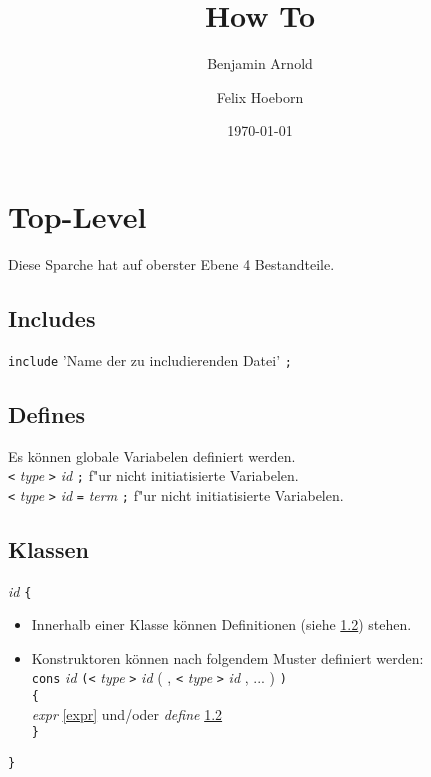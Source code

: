\documentclass{article}
\begin{document}
\title{ How To }
\author{ Benjamin Arnold \and Felix Hoeborn }
\date{ \today }
\maketitle
\newpage
\tableofcontents
\newpage
\setcounter{page}{1}
\pagestyle{plain}

\section{Top-Level}
Diese Sparche hat auf oberster Ebene 4 Bestandteile.

\subsection{Includes}
\texttt{include} 'Name der zu includierenden Datei' \texttt{;} \\

\subsection{Defines} \label{define}
Es können globale Variabelen definiert werden. \\
\texttt{<} \textit{type} \texttt{>} \textit{id}  \texttt{;} f"ur nicht initiatisierte Variabelen. \\
\texttt{<} \textit{type} \texttt{>} \textit{id} \texttt{=} \textit{term} \texttt{;} f"ur nicht initiatisierte Variabelen.

\subsection{Klassen} \label{struct}
\textit{id} \texttt{\{}
\begin{itemize}
\item[]{Innerhalb einer Klasse können Definitionen  {\small(siehe \ref{define})} stehen.}
\item[]{Konstruktoren können nach folgendem Muster definiert werden:\\
\texttt{cons} \textit{id} \texttt{(<} \textit{type} \texttt{>} \textit{id} {\small( , \texttt{<} \textit{type} \texttt{>} \textit{id} , ... )} \texttt{)}\\ 
\texttt{\{}\\
\textit{expr} {\tiny\ref{expr}} und/oder \textit{define} {\tiny\ref{define}}\\
\texttt{\}}}
\end{itemize}
\texttt{\}}
\end{document}
